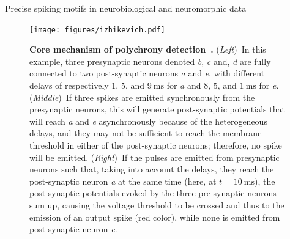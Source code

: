 \documentclass[final]{beamer}
\newcommand{\ms}{\mathrm{ms}}%
\newlength{\colwidth}
\begin{document}
\begin{frame}[t]
\begin{columns}[t]
\begin{column}{\colwidth}
\begin{block}{Precise spiking motifs in neurobiological and neuromorphic data~\parencite{Grimaldi22polychronies}}
    \begin{figure}[H]%
        \texttt{[image: figures/izhikevich.pdf]}%
          \caption{
           \justifying 
\textbf{Core mechanism of polychrony detection~\parencite{izhikevich_polychronization_2006}.} {(\textit{Left})}~In this example, three presynaptic neurons denoted \textit{b}, \textit{c} and, \textit{d} are fully connected to two post-synaptic neurons \textit{a} and \textit{e}, with different delays of respectively $1$, $5$, and $9~\ms$ for \textit{a} and  $8$, $5$, and $1~\ms$ for \textit{e}. {(\textit{Middle})}~If three spikes are emitted  synchronously from the presynaptic neurons, this will generate post-synaptic potentials that will reach \textit{a} and \textit{e} asynchronously because of the heterogeneous delays, and they may not be sufficient to reach the membrane threshold in either of the post-synaptic neurons; therefore, no spike will be emitted.
          {(\textit{Right})}~If the pulses are emitted from presynaptic neurons such that, taking into account the delays, they reach the post-synaptic neuron \textit{a} at the same time (here, at $t=10~\ms$),  the post-synaptic potentials evoked by the three pre-synaptic neurons sum up, causing the voltage threshold to be crossed and thus to the emission of an output spike (red color), while none is emitted from post-synaptic neuron \textit{e}.
           }
        \label{fig:izhikevich}
      \end{figure}
%

  \end{block}


\end{column}
\end{columns}
\end{frame}
\end{document}
